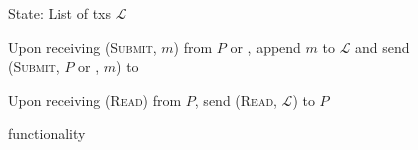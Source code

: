  \begin{figure}[H]
    \begin{systembox}{\perfectledger}
      \begin{algorithmic}[1]
        \State State: List of txs $\mathcal{L}$
        \Statex

        \State Upon receiving (\textsc{Submit}, $m$) from $P$ or
        \adversary, append $m$ to $\mathcal{L}$ and send (\textsc{Submit},
        $P$ or \adversary, $m$) to \adversary
        \Statex

        \State Upon receiving (\textsc{Read}) from $P$, send (\textsc{Read},
        $\mathcal{L}$) to $P$
      \end{algorithmic}
    \end{systembox}
    \caption{\perfectledger functionality}
    \label{fig:perfectledger:func}
  \end{figure}

